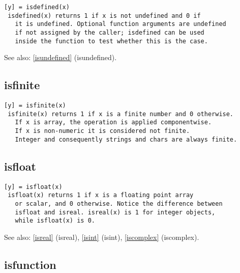 \documentclass[a4paper]{article}
\begin{document}
\begin{tscreen}
\begin{verbatim}
[y] = isdefined(x)
 isdefined(x) returns 1 if x is not undefined and 0 if
   it is undefined. Optional function arguments are undefined
   if not assigned by the caller; isdefined can be used
   inside the function to test whether this is the case.
\end{verbatim}

See also: \ref{isundefined} {(isundefined)}.
\end{tscreen}





\subsection{isfinite\label{isfinite}}

\begin{tscreen}
\begin{verbatim}
[y] = isfinite(x)
 isfinite(x) returns 1 if x is a finite number and 0 otherwise.
   If x is array, the operation is applied componentwise.
   If x is non-numeric it is considered not finite.
   Integer and consequently strings and chars are always finite. 
\end{verbatim}
\end{tscreen}





\subsection{isfloat\label{isfloat}}

\begin{tscreen}
\begin{verbatim}
[y] = isfloat(x)
 isfloat(x) returns 1 if x is a floating point array
   or scalar, and 0 otherwise. Notice the difference between
   isfloat and isreal. isreal(x) is 1 for integer objects,
   while isfloat(x) is 0.
\end{verbatim}

See also: \ref{isreal} {(isreal)}, \ref{isint} {(isint)}, \ref{iscomplex} {(iscomplex)}.
\end{tscreen}





\subsection{isfunction\label{isfunction}}
\end{document}
